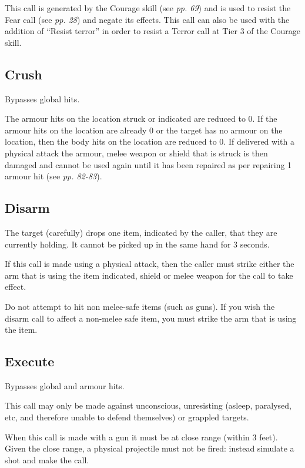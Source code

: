\documentclass{scrbook}
\begin{document}
This call is generated by the Courage skill (see \textit{pp. 69}) and is used to resist the Fear call (see \textit{pp. 28}) and negate its effects. This call can also be used with the addition of ``Resist terror'' in order to resist a Terror call at Tier 3 of the Courage skill.

\subsection{Crush}

Bypasses global hits.

The armour hits on the location struck or indicated are reduced to 0. If the armour hits on the location are already 0 or the target has no armour on the location, then the body hits on the location are reduced to 0. If delivered with a physical attack the armour, melee weapon or shield that is struck is then damaged and cannot be used again until it has been repaired as per repairing 1 armour hit (see \textit{pp. 82-83}).

\subsection{Disarm}

The target (carefully) drops one item, indicated by the caller, that they are currently holding. It cannot be picked up in the same hand for 3 seconds.

If this call is made using a physical attack, then the caller must strike either the arm that is using the item indicated, shield or melee weapon for the call to take effect.

Do not attempt to hit non melee-safe items (such as guns). If you wish the disarm call to affect a non-melee safe item, you must strike the arm that is using the item.

\subsection{Execute}

Bypasses global and armour hits.

This call may only be made against unconscious, unresisting (asleep, paralysed, etc, and therefore unable to defend themselves) or grappled targets.

When this call is made with a gun it must be at close range (within 3 feet). Given the close range, a physical projectile must not be fired: instead simulate a shot and make the call.
\end{document}
